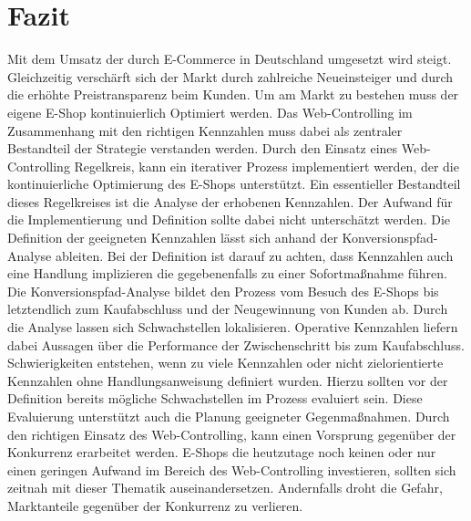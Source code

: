 \newpage
\section{Fazit}
Mit dem Umsatz der durch E-Commerce in Deutschland umgesetzt wird steigt. Gleichzeitig verschärft sich der Markt durch zahlreiche Neueinsteiger und durch die erhöhte Preistransparenz beim Kunden. Um am Markt zu bestehen muss der eigene E-Shop kontinuierlich Optimiert werden. Das Web-Controlling im Zusammenhang mit den richtigen Kennzahlen muss dabei als zentraler Bestandteil der Strategie verstanden werden. Durch den Einsatz eines Web-Controlling Regelkreis, kann ein iterativer Prozess implementiert werden, der die kontinuierliche Optimierung des E-Shops unterstützt. Ein essentieller Bestandteil dieses Regelkreises ist die Analyse der erhobenen Kennzahlen. Der Aufwand für die Implementierung und Definition sollte dabei nicht unterschätzt werden. Die Definition der geeigneten Kennzahlen lässt sich anhand der Konversionspfad-Analyse ableiten. Bei der Definition ist darauf zu achten, dass Kennzahlen auch eine Handlung implizieren die gegebenenfalls zu einer Sofortmaßnahme führen. Die Konversionspfad-Analyse bildet den Prozess vom Besuch des E-Shops bis letztendlich zum Kaufabschluss und der Neugewinnung von Kunden ab. Durch die Analyse lassen sich Schwachstellen lokalisieren. Operative Kennzahlen liefern dabei Aussagen über die Performance der Zwischenschritt bis zum Kaufabschluss.
Schwierigkeiten entstehen, wenn zu viele Kennzahlen oder nicht zielorientierte Kennzahlen ohne Handlungsanweisung definiert wurden. Hierzu sollten vor der Definition bereits mögliche Schwachstellen im Prozess evaluiert sein. Diese Evaluierung unterstützt auch die Planung geeigneter Gegenmaßnahmen. Durch den richtigen Einsatz des Web-Controlling, kann einen Vorsprung gegenüber der Konkurrenz erarbeitet werden. E-Shops die heutzutage noch keinen oder nur einen geringen Aufwand im Bereich des Web-Controlling investieren, sollten sich zeitnah mit dieser Thematik auseinandersetzen. Andernfalls droht die Gefahr, Marktanteile gegenüber der Konkurrenz zu verlieren.
